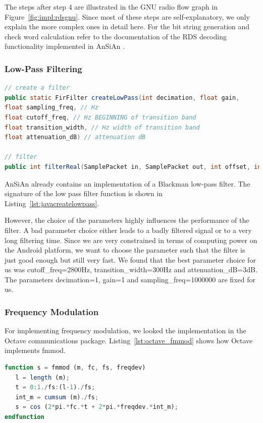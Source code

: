 The steps after step 4 are illustrated in the GNU radio flow graph in Figure~\ref{fig:impl:rdsgnu}. Since most of these steps are self-explanatory, we only explain the more complex ones in detail here. For the bit string generation and check word calculation refer to the documentation of the RDS decoding functionality implemented in AnSiAn \cite[Section 4.2.3]{Mantz2016}. 

\subsubsection{Low-Pass Filtering}
\begin{lstlisting}[label=lst:javacreatelowpass, caption=AnSiAn Blackman Low-Pass Filter, language=java]
// create a filter 
public static FirFilter createLowPass(int decimation, float gain, 
float sampling_freq, // Hz
float cutoff_freq, // Hz BEGINNING of transition band
float transition_width, // Hz width of transition band
float attenuation_dB) // attenuation dB

// filter 
public int filterReal(SamplePacket in, SamplePacket out, int offset, int length)    

\end{lstlisting}

AnSiAn already contains an implementation of a Blackman low-pass filter. The signature of the low pass filter function is shown in Listing~\ref{lst:javacreatelowpass}.


However, the choice of the parameters highly influences the performance of the filter. A bad parameter choice either leads to a badly filtered signal or to a very long filtering time. Since we are very constrained in terms of computing power on the Android platform, we want to choose the parameter such that the filter is just good enough but still very fast. 
We found that the best parameter choice for us was cutoff\_freq=2800Hz, transition\_width=300Hz and attenuation\_dB=3dB. \\
The parameters decimation=1, gain=1 and sampling\_freq=1000000 are fixed for us. 

\subsubsection{Frequency Modulation}

For implementing frequency modulation, we looked the implementation in the Octave communications package. Listing~\ref{lst:octave_fmmod} shows how Octave implements fmmod. 
\newpage
\lstset{numbers=left}
\lstset{stepnumber=1}
\begin{lstlisting}[label=lst:octave_fmmod, caption=Octave Implementation of Frequency Modulation \cite{octavefmmod}, language=octave,]
function s = fmmod (m, fc, fs, freqdev)
   l = length (m);
   t = 0:1./fs:(l-1)./fs;
   int_m = cumsum (m)./fs;
   s = cos (2*pi.*fc.*t + 2*pi.*freqdev.*int_m);
endfunction
\end{lstlisting}

